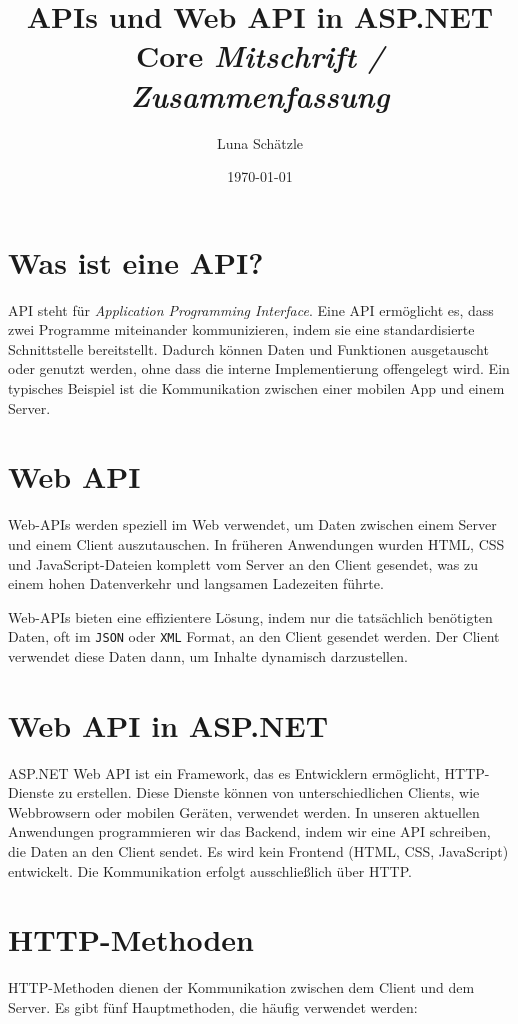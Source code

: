 \documentclass[a4paper,12pt]{report}
\title{
    \vspace{2cm}
    \Huge \textbf{APIs und Web API in ASP.NET Core}
    \vspace{1cm}
    \Large \textit{Mitschrift / Zusammenfassung}
    \vspace{2cm}
}
\author{Luna Schätzle}
\date{\today}
\begin{document}
\maketitle

\tableofcontents
\newpage

\section{Was ist eine API?}
API steht für \textit{Application Programming Interface}. Eine API ermöglicht es, dass zwei Programme miteinander kommunizieren, indem sie eine standardisierte Schnittstelle bereitstellt. Dadurch können Daten und Funktionen ausgetauscht oder genutzt werden, ohne dass die interne Implementierung offengelegt wird. Ein typisches Beispiel ist die Kommunikation zwischen einer mobilen App und einem Server.

\section{Web API}
Web-APIs werden speziell im Web verwendet, um Daten zwischen einem Server und einem Client auszutauschen. In früheren Anwendungen wurden HTML, CSS und JavaScript-Dateien komplett vom Server an den Client gesendet, was zu einem hohen Datenverkehr und langsamen Ladezeiten führte. 

Web-APIs bieten eine effizientere Lösung, indem nur die tatsächlich benötigten Daten, oft im \texttt{JSON} oder \texttt{XML} Format, an den Client gesendet werden. Der Client verwendet diese Daten dann, um Inhalte dynamisch darzustellen.

\section{Web API in ASP.NET}
ASP.NET Web API ist ein Framework, das es Entwicklern ermöglicht, HTTP-Dienste zu erstellen. Diese Dienste können von unterschiedlichen Clients, wie Webbrowsern oder mobilen Geräten, verwendet werden. In unseren aktuellen Anwendungen programmieren wir das Backend, indem wir eine API schreiben, die Daten an den Client sendet. Es wird kein Frontend (HTML, CSS, JavaScript) entwickelt. Die Kommunikation erfolgt ausschließlich über HTTP.

\section{HTTP-Methoden}
HTTP-Methoden dienen der Kommunikation zwischen dem Client und dem Server. Es gibt fünf Hauptmethoden, die häufig verwendet werden:
\end{document}
